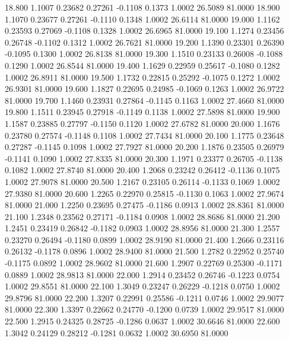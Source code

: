   18.800   1.1007   0.23682   0.27261  -0.1108   0.1373   1.0002  26.5089  81.0000
  18.900   1.1070   0.23677   0.27261  -0.1110   0.1348   1.0002  26.6114  81.0000
  19.000   1.1162   0.23593   0.27069  -0.1108   0.1328   1.0002  26.6965  81.0000
  19.100   1.1274   0.23456   0.26748  -0.1102   0.1312   1.0002  26.7621  81.0000
  19.200   1.1390   0.23301   0.26390  -0.1095   0.1300   1.0002  26.8138  81.0000
  19.300   1.1510   0.23133   0.26008  -0.1088   0.1290   1.0002  26.8544  81.0000
  19.400   1.1629   0.22959   0.25617  -0.1080   0.1282   1.0002  26.8911  81.0000
  19.500   1.1732   0.22815   0.25292  -0.1075   0.1272   1.0002  26.9301  81.0000
  19.600   1.1827   0.22695   0.24985  -0.1069   0.1263   1.0002  26.9722  81.0000
  19.700   1.1460   0.23931   0.27864  -0.1145   0.1163   1.0002  27.4660  81.0000
  19.800   1.1511   0.23945   0.27918  -0.1149   0.1138   1.0002  27.5898  81.0000
  19.900   1.1587   0.23885   0.27797  -0.1150   0.1120   1.0002  27.6782  81.0000
  20.000   1.1676   0.23780   0.27574  -0.1148   0.1108   1.0002  27.7434  81.0000
  20.100   1.1775   0.23648   0.27287  -0.1145   0.1098   1.0002  27.7927  81.0000
  20.200   1.1876   0.23505   0.26979  -0.1141   0.1090   1.0002  27.8335  81.0000
  20.300   1.1971   0.23377   0.26705  -0.1138   0.1082   1.0002  27.8740  81.0000
  20.400   1.2068   0.23242   0.26412  -0.1136   0.1075   1.0002  27.9078  81.0000
  20.500   1.2167   0.23105   0.26114  -0.1133   0.1069   1.0002  27.9380  81.0000
  20.600   1.2265   0.22970   0.25815  -0.1130   0.1063   1.0002  27.9674  81.0000
  21.000   1.2250   0.23695   0.27475  -0.1186   0.0913   1.0002  28.8361  81.0000
  21.100   1.2348   0.23562   0.27171  -0.1184   0.0908   1.0002  28.8686  81.0000
  21.200   1.2451   0.23419   0.26842  -0.1182   0.0903   1.0002  28.8956  81.0000
  21.300   1.2557   0.23270   0.26494  -0.1180   0.0899   1.0002  28.9190  81.0000
  21.400   1.2666   0.23116   0.26132  -0.1178   0.0896   1.0002  28.9400  81.0000
  21.500   1.2782   0.22952   0.25740  -0.1175   0.0892   1.0002  28.9602  81.0000
  21.600   1.2907   0.22769   0.25300  -0.1171   0.0889   1.0002  28.9813  81.0000
  22.000   1.2914   0.23452   0.26746  -0.1223   0.0754   1.0002  29.8551  81.0000
  22.100   1.3049   0.23247   0.26229  -0.1218   0.0750   1.0002  29.8796  81.0000
  22.200   1.3207   0.22991   0.25586  -0.1211   0.0746   1.0002  29.9077  81.0000
  22.300   1.3397   0.22662   0.24770  -0.1200   0.0739   1.0002  29.9517  81.0000
  22.500   1.2915   0.24325   0.28725  -0.1286   0.0637   1.0002  30.6646  81.0000
  22.600   1.3042   0.24129   0.28212  -0.1281   0.0632   1.0002  30.6950  81.0000
